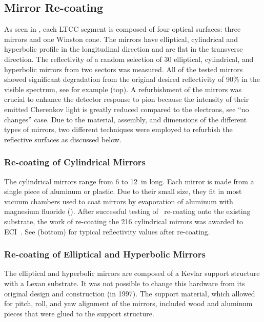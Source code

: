 \subsection{Mirror Re-coating}

As seen in , each LTCC segment is composed of four optical surfaces: three mirrors and one Winston cone.
The mirrors have elliptical, cylindrical and hyperbolic profile in the longitudinal direction and are flat in the
transverse direction.
The reflectivity of a random selection of 30 elliptical, cylindrical,
and hyperbolic mirrors from two sectors was measured. All of the tested mirrors showed significant degradation
from the original desired reflectivity of 90\% in the visible spectrum, see for example 
(top). A refurbishment of the mirrors was crucial to enhance the detector response to pion because the intensity
of their emitted  Cherenkov light is greatly reduced compared to the electrons, see 
``no changes'' case.
Due to the material, assembly, and dimensions of the different types of mirrors, two different techniques were
employed to refurbish the reflective surfaces as discussed below.

\subsubsection{Re-coating of Cylindrical Mirrors}

The cylindrical mirrors range from 6 to 12~in long. Each mirror is made from a single piece of aluminum or plastic. Due
to their small size, they fit in most vacuum chambers used to coat mirrors by evaporation of aluminum with magnesium
fluoride (\coating). After successful testing of \coating\ re-coating onto the existing substrate, the work of
re-coating the 216 cylindrical mirrors was awarded to ECI~\cite{ECI}. See  (bottom)
for typical reflectivity values after re-coating.

\subsubsection{Re-coating of Elliptical and Hyperbolic Mirrors}

The elliptical and hyperbolic mirrors are composed of a Kevlar support structure with a Lexan substrate. It was not
possible to change this hardware from its original design and construction (in 1997). The support material, which allowed
for pitch, roll, and yaw alignment of the mirrors, included wood and aluminum pieces that were glued to the support
structure.

